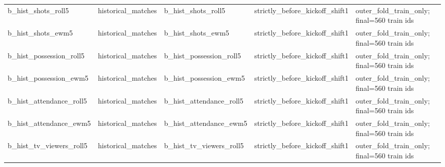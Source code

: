 {\begin{longtable}{p{}p{}p{}p{}p{}}
b\_\allowbreak{}hist\_\allowbreak{}shots\_\allowbreak{}roll5 & historical\_\allowbreak{}matches & b\_\allowbreak{}hist\_\allowbreak{}shots\_\allowbreak{}roll5 & strictly\_\allowbreak{}before\_\allowbreak{}kickoff\_\allowbreak{}shift1 & outer\_\allowbreak{}fold\_\allowbreak{}train\_\allowbreak{}only;\allowbreak{} final=560 train ids \\
b\_\allowbreak{}hist\_\allowbreak{}shots\_\allowbreak{}ewm5 & historical\_\allowbreak{}matches & b\_\allowbreak{}hist\_\allowbreak{}shots\_\allowbreak{}ewm5 & strictly\_\allowbreak{}before\_\allowbreak{}kickoff\_\allowbreak{}shift1 & outer\_\allowbreak{}fold\_\allowbreak{}train\_\allowbreak{}only;\allowbreak{} final=560 train ids \\
b\_\allowbreak{}hist\_\allowbreak{}possession\_\allowbreak{}roll5 & historical\_\allowbreak{}matches & b\_\allowbreak{}hist\_\allowbreak{}possession\_\allowbreak{}roll5 & strictly\_\allowbreak{}before\_\allowbreak{}kickoff\_\allowbreak{}shift1 & outer\_\allowbreak{}fold\_\allowbreak{}train\_\allowbreak{}only;\allowbreak{} final=560 train ids \\
b\_\allowbreak{}hist\_\allowbreak{}possession\_\allowbreak{}ewm5 & historical\_\allowbreak{}matches & b\_\allowbreak{}hist\_\allowbreak{}possession\_\allowbreak{}ewm5 & strictly\_\allowbreak{}before\_\allowbreak{}kickoff\_\allowbreak{}shift1 & outer\_\allowbreak{}fold\_\allowbreak{}train\_\allowbreak{}only;\allowbreak{} final=560 train ids \\
b\_\allowbreak{}hist\_\allowbreak{}attendance\_\allowbreak{}roll5 & historical\_\allowbreak{}matches & b\_\allowbreak{}hist\_\allowbreak{}attendance\_\allowbreak{}roll5 & strictly\_\allowbreak{}before\_\allowbreak{}kickoff\_\allowbreak{}shift1 & outer\_\allowbreak{}fold\_\allowbreak{}train\_\allowbreak{}only;\allowbreak{} final=560 train ids \\
b\_\allowbreak{}hist\_\allowbreak{}attendance\_\allowbreak{}ewm5 & historical\_\allowbreak{}matches & b\_\allowbreak{}hist\_\allowbreak{}attendance\_\allowbreak{}ewm5 & strictly\_\allowbreak{}before\_\allowbreak{}kickoff\_\allowbreak{}shift1 & outer\_\allowbreak{}fold\_\allowbreak{}train\_\allowbreak{}only;\allowbreak{} final=560 train ids \\
b\_\allowbreak{}hist\_\allowbreak{}tv\_\allowbreak{}viewers\_\allowbreak{}roll5 & historical\_\allowbreak{}matches & b\_\allowbreak{}hist\_\allowbreak{}tv\_\allowbreak{}viewers\_\allowbreak{}roll5 & strictly\_\allowbreak{}before\_\allowbreak{}kickoff\_\allowbreak{}shift1 & outer\_\allowbreak{}fold\_\allowbreak{}train\_\allowbreak{}only;\allowbreak{} final=560 train ids \\

\end{longtable}}
